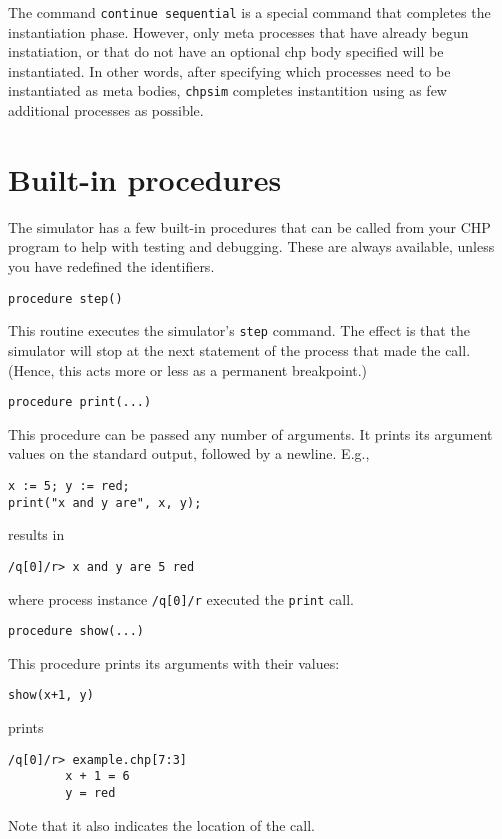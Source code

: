 The command \verb|continue sequential| is a special command that completes the
instantiation phase.  However, only meta processes that have already begun
instatiation, or that do not have an optional chp body specified will be
instantiated.  In other words, after specifying which processes need to be
instantiated as meta bodies, \verb|chpsim| completes instantition using as few
additional processes as possible.




\section{Built-in procedures}\label{sec:builtin}

The simulator has a few built-in procedures that can be called from
your CHP program to help with testing and debugging. These are
always available, unless you have redefined the identifiers.

\begin{verbatim}
procedure step()
\end{verbatim}
This routine executes the simulator's \verb|step| command. The effect is that
the simulator will stop at the next statement of the process that made the
call. (Hence, this acts more or less as a permanent breakpoint.)

\begin{verbatim}
procedure print(...)
\end{verbatim}
This procedure can be passed any number of arguments. It prints its argument
values on the standard output, followed by a newline. E.g.,
\begin{verbatim}
x := 5; y := red;
print("x and y are", x, y);
\end{verbatim}
results in
\begin{verbatim}
/q[0]/r> x and y are 5 red
\end{verbatim}
where process instance \verb|/q[0]/r| executed the \verb|print| call.

\begin{verbatim}
procedure show(...)
\end{verbatim}
This procedure prints its arguments with their values:
\begin{verbatim}
show(x+1, y)
\end{verbatim}
prints
\begin{verbatim}
/q[0]/r> example.chp[7:3] 
        x + 1 = 6
        y = red
\end{verbatim}
Note that it also indicates the location of the call.

